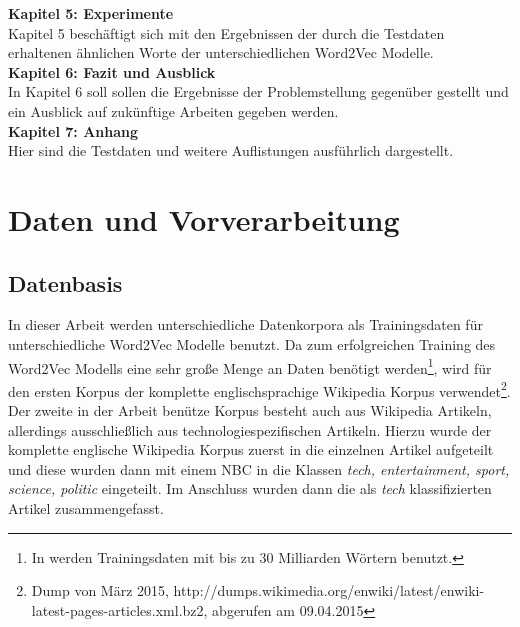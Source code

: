 \documentclass[12pt,a4paper]{report}
\begin{document}
	\textbf{Kapitel 5: Experimente}\\
	Kapitel 5 beschäftigt sich mit den Ergebnissen der durch die Testdaten erhaltenen ähnlichen Worte der unterschiedlichen Word2Vec Modelle.\\
	
	\textbf{Kapitel 6: Fazit und Ausblick}\\
	In Kapitel 6 soll sollen die Ergebnisse der Problemstellung gegenüber gestellt und ein Ausblick auf zukünftige Arbeiten gegeben werden.\\
	
	\textbf{Kapitel 7: Anhang}\\
	Hier sind die Testdaten und weitere Auflistungen ausführlich dargestellt.\\

\newpage
\chapter{Daten und Vorverarbeitung}
	\section{Datenbasis}
	In dieser Arbeit werden unterschiedliche Datenkorpora als Trainingsdaten für unterschiedliche Word2Vec Modelle benutzt. Da zum erfolgreichen Training des Word2Vec Modells eine sehr große Menge an Daten benötigt werden\footnote{In \cite{DBLP:journals/corr/MikolovSCCD13} werden Trainingsdaten mit bis zu 30 Milliarden Wörtern benutzt.}, wird für den ersten Korpus der komplette englischsprachige Wikipedia Korpus verwendet\footnote{Dump von März 2015, http://dumps.wikimedia.org/enwiki/latest/enwiki-latest-pages-articles.xml.bz2, abgerufen am 09.04.2015}. Der zweite in der Arbeit benütze Korpus besteht auch aus Wikipedia Artikeln, allerdings ausschließlich aus technologiespezifischen Artikeln. Hierzu wurde der komplette englische Wikipedia Korpus zuerst in die einzelnen Artikel aufgeteilt und diese wurden dann mit einem NBC in die Klassen \textit{tech, entertainment, sport, science, politic} eingeteilt. Im Anschluss wurden dann die als \textit{tech} klassifizierten Artikel zusammengefasst.
	
\end{document}
